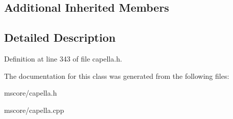 \subsection*{Additional Inherited Members}


\subsection{Detailed Description}


Definition at line 343 of file capella.\+h.



The documentation for this class was generated from the following files\+:\begin{DoxyCompactItemize}
\item 
mscore/capella.\+h\item 
mscore/capella.\+cpp\end{DoxyCompactItemize}
